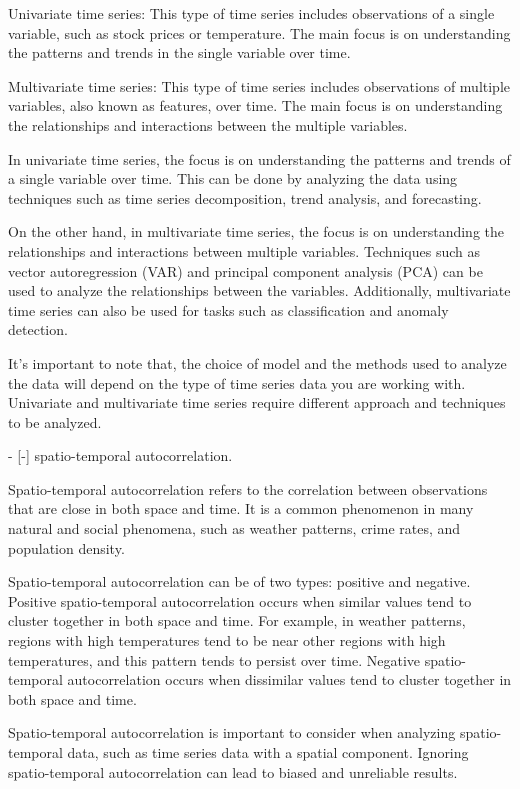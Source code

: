 Univariate time series: This type of time series includes observations of a single variable, such as stock prices or temperature. The main focus is on understanding the patterns and trends in the single variable over time.

Multivariate time series: This type of time series includes observations of multiple variables, also known as features, over time. The main focus is on understanding the relationships and interactions between the multiple variables.

In univariate time series, the focus is on understanding the patterns and trends of a single variable over time. This can be done by analyzing the data using techniques such as time series decomposition, trend analysis, and forecasting.

On the other hand, in multivariate time series, the focus is on understanding the relationships and interactions between multiple variables. Techniques such as vector autoregression (VAR) and principal component analysis (PCA) can be used to analyze the relationships between the variables. Additionally, multivariate time series can also be used for tasks such as classification and anomaly detection.

It's important to note that, the choice of model and the methods used to analyze the data will depend on the type of time series data you are working with. Univariate and multivariate time series require different approach and techniques to be analyzed.

- [-] spatio-temporal autocorrelation.

Spatio-temporal autocorrelation refers to the correlation between observations that are close in both space and time. It is a common phenomenon in many natural and social phenomena, such as weather patterns, crime rates, and population density.

Spatio-temporal autocorrelation can be of two types: positive and negative. Positive spatio-temporal autocorrelation occurs when similar values tend to cluster together in both space and time. For example, in weather patterns, regions with high temperatures tend to be near other regions with high temperatures, and this pattern tends to persist over time. Negative spatio-temporal autocorrelation occurs when dissimilar values tend to cluster together in both space and time.

Spatio-temporal autocorrelation is important to consider when analyzing spatio-temporal data, such as time series data with a spatial component. Ignoring spatio-temporal autocorrelation can lead to biased and unreliable results.

